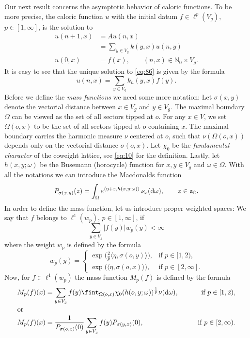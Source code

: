 \documentclass[11pt]{amsart}
\newcommand{\CC}{\mathbb{C}}
\newcommand{\NN}{\mathbb{N}}
\newcommand{\sprod}[2]{\langle {#1}, {#2} \rangle}
\theoremstyle{plain}
\theoremstyle{definition}
\numberwithin{equation}{section}
\begin{document}
Our next result concerns the asymptotic behavior of caloric functions. To be more precise, the caloric function $u$ with 
the initial datum $f \in \ell^p(V_g)$, $p \in [1, \infty]$, is the solution to
\begin{equation}
	\label{eq:86}
	\begin{aligned}
		u(n+1, x) &= A u(n, x) \\
		&= \sum_{y \in V_g} k(y, x) u(n, y) \\
		u(0, x) &= f(x), \qquad (n, x) \in \NN_0 \times V_g.
	\end{aligned}
\end{equation}
It is easy to see that the unique solution to \eqref{eq:86} is given by the formula
\[
	u(n, x) = \sum_{y \in V_g} k_n(y, x) f(y).
\]
Before we define the \emph{mass functions} we need some more notation: Let $\sigma(x, y)$ denote the vectorial distance between
$x \in V_g$ and $y \in V_g$. The maximal boundary $\Omega$ can be viewed as the set of all sectors tipped at $o$. For
any $x \in V$, we set $\Omega(o, x)$ to be the set of all sectors tipped at $o$ containing $x$. The maximal boundary 
carries the harmonic measure $\nu$ centered at $o$, such that $\nu(\Omega(o, x))$ depends only on the vectorial distance
$\sigma(o, x)$. Let $\chi_0$ be the \emph{fundamental character} of the coweight lattice, see \eqref{eq:10} for the definition.
Lastly, let $h(x, y; \omega)$ be the Busemann (horocycle) function for $x, y \in V_g$ and $\omega \in \Omega$.
With all the notations we can introduce the Macdonalds function
\[
	P_{\sigma(x,y)}(z) = \int_\Omega e^{\sprod{\eta + z}{h(x, y; \omega)}} \, \nu_x({\rm d} \omega), 
	\qquad z \in \mathfrak{a}_{\CC}.
\]
In order to define the mass function, let us introduce proper weighted spaces: We say that $f$ belongs to $\ell^1(w_p)$,
$p \in [1, \infty]$, if
\[
	\sum_{y \in V_g} |f(y)| w_p(y) < \infty
\]
where the weight $w_p$ is defined by the formula
\[
	w_p(y) =
		\begin{cases} \exp\big(\tfrac{2}{p}\sprod{\eta}{\sigma(o, y)}\big),  &\text{if } p \in [1, 2), \\
	\exp\big(\sprod{\eta}{\sigma(o, x)}\big), &\text{if } p \in [2, \infty].
	\end{cases}
\]
Now, for $f \in \ell^1(w_p)$ the mass function $M_p(f)$ is defined by the formula
\begin{align} 
	\label{eq:55}
	M_p(f)(x) &= \sum_{y \in V_g} f(y)	
	\fint_{\Omega(o,x)} \chi_{0}(h(o,y;\omega))^\frac{1}{p} \nu({\rm d} \omega), \qquad &\text{if } p \in [1, 2), \\
\intertext{or}
	\label{eq:56}
	M_p(f)(x) &= \frac{1}{P_{\sigma(o, x)}(0)} \sum_{y \in V_g} f(y) P_{\sigma(y, x)}(0), &\text{if } 
	p \in [2, \infty). 
\end{align}
\end{document}
